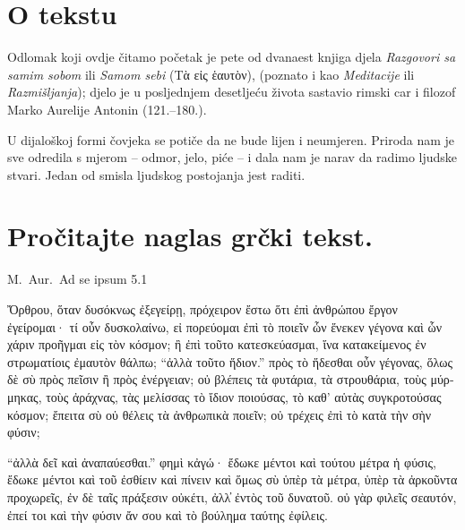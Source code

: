 


\section*{O tekstu}

Odlomak koji ovdje čitamo početak je pete od dvanaest knjiga djela \textit{Razgovori sa samim sobom} ili \textit{Samom sebi} \textgreek[variant=ancient]{(Τὰ εἰς ἑαυτὸν),} (poznato i kao \textit{Meditacije} ili \textit{Razmišljanja}); djelo je u posljednjem desetljeću života sastavio rimski car i filozof Marko Aurelije Antonin (121.–180.).

U dijaloškoj formi čovjeka se potiče da ne bude lijen i neumjeren. Priroda nam je sve odredila s mjerom – odmor, jelo, piće – i dala nam je narav da radimo ljudske stvari. Jedan od smisla ljudskog postojanja jest raditi.




\section*{Pročitajte naglas grčki tekst.}

M.\ Aur.\ Ad se ipsum 5.1


\medskip


{\large

\begin{greek}

\noindent  Ὄρθρου, ὅταν δυσόκνως ἐξεγείρῃ, πρόχειρον ἔστω ὅτι ἐπὶ ἀνθρώπου ἔργον ἐγείρομαι· τί οὖν δυσκολαίνω, εἰ πορεύομαι ἐπὶ τὸ ποιεῖν ὧν ἕνεκεν γέγονα καὶ ὧν χάριν προῆγμαι εἰς τὸν κόσμον; ἢ ἐπὶ τοῦτο κατεσκεύασμαι, ἵνα κατακείμενος ἐν στρωματίοις ἐμαυτὸν θάλπω; ``ἀλλὰ τοῦτο ἥδιον.'' πρὸς τὸ ἥδεσθαι οὖν γέγονας, ὅλως δὲ σὺ πρὸς πεῖσιν ἢ πρὸς ἐνέργειαν; οὐ βλέπεις τὰ φυτάρια, τὰ στρουθάρια, τοὺς μύρμηκας, τοὺς ἀράχνας, τὰς μελίσσας τὸ ἴδιον ποιούσας, τὸ καθ' αὑτὰς συγκροτούσας κόσμον; ἔπειτα σὺ οὐ θέλεις τὰ ἀνθρωπικὰ ποιεῖν; οὐ τρέχεις ἐπὶ τὸ κατὰ τὴν σὴν φύσιν; 

\noindent ``ἀλλὰ δεῖ καὶ ἀναπαύεσθαι.'' φημὶ κἀγώ· ἔδωκε μέντοι καὶ τούτου μέτρα ἡ φύσις, ἔδωκε μέντοι καὶ τοῦ ἐσθίειν καὶ πίνειν καὶ ὅμως σὺ ὑπὲρ τὰ μέτρα, ὑπὲρ τὰ ἀρκοῦντα προχωρεῖς, ἐν δὲ ταῖς πράξεσιν οὐκέτι, ἀλλ̓ ἐντὸς τοῦ δυνατοῦ. οὐ γὰρ φιλεῖς σεαυτόν, ἐπεί τοι καὶ τὴν φύσιν ἄν σου καὶ τὸ βούλημα ταύτης ἐφίλεις.

\end{greek}

}


